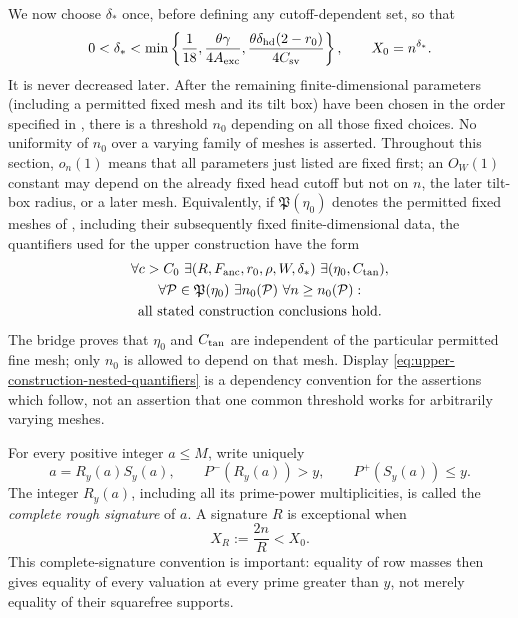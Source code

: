 \documentclass[11pt]{article}
\numberwithin{equation}{section}
\theoremstyle{definition}
\theoremstyle{remark}
\newcommand{\1}{\mathbf 1}
\begin{document}
We now choose \(\delta_*\) once, before defining any cutoff-dependent
set, so that
\begin{equation}
 0<\delta_*<
 \min\left\{
   \frac1{18},
   \frac{\theta\gamma}{4A_{\rm exc}},
   \frac{\theta\delta_{\rm hd}(2-r_0)}{4C_{\rm sv}}
 \right\},
 \qquad X_0=n^{\delta_*}.
 \label{eq:rough-cutoff}
\end{equation}
It is never decreased later.  After the remaining finite-dimensional
parameters (including a permitted fixed mesh and its tilt box) have been
chosen in the order specified in , there is a
threshold \(n_0\) depending on all those fixed choices.  No uniformity of
\(n_0\) over a varying family of meshes is asserted.  Throughout this
section, \(o_n(1)\) means that all parameters just listed are fixed first;
an \(O_W(1)\) constant may depend on the already fixed head cutoff but not
on \(n\), the later tilt-box radius, or a later mesh.
Equivalently, if \(\mathfrak P(\eta_0)\) denotes the permitted fixed
meshes of , including their subsequently fixed
finite-dimensional data, the quantifiers used for the upper construction
have the form
\begin{equation}
 \begin{gathered}
 \forall c>C_0\ \exists
 (R,F_{\rm anc},r_0,\rho,W,\delta_*)\ \exists(\eta_0,C_{\rm tan}),\\
 \forall\mathcal P\in\mathfrak P(\eta_0)\ \exists n_0(\mathcal P)\
 \forall n\ge n_0(\mathcal P):\\
 \text{all stated construction conclusions hold}.
 \end{gathered}
 \label{eq:upper-construction-nested-quantifiers}
\end{equation}
The bridge proves that \(\eta_0\) and \(C_{\rm tan}\) are independent of
the particular permitted fine mesh; only \(n_0\) is allowed to depend on
that mesh.  Display \eqref{eq:upper-construction-nested-quantifiers} is a
dependency convention for the assertions which follow, not an assertion
that one common threshold works for arbitrarily varying meshes.

For every positive integer \(a\le M\), write uniquely
\begin{equation}
 a=R_y(a)S_y(a),\qquad P^-(R_y(a))>y,\qquad
 P^+(S_y(a))\le y.
 \label{eq:complete-rough-decomposition}
\end{equation}
The integer \(R_y(a)\), including all its prime-power multiplicities, is
called the \emph{complete rough signature} of \(a\).  A signature \(R\) is
exceptional when
\begin{equation}
 X_R:=\frac{2n}{R}<X_0.
 \label{eq:exceptional-signature}
\end{equation}
This complete-signature convention is important: equality of row masses
then gives equality of every valuation at every prime greater than \(y\),
not merely equality of their squarefree supports.
\end{document}
